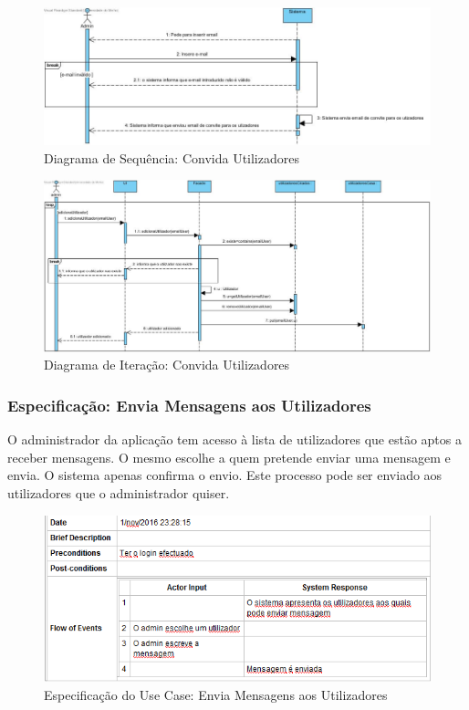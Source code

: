 \begin{figure}[htb!]
	\centering
	\includegraphics[scale=0.5]{imagens/diagramaSeq/ConvidaUtilizadores}  
	\caption{Diagrama de Sequência: Convida Utilizadores }  
\end{figure}

\begin{figure}[htb!]
	\centering
	\includegraphics[scale=0.46]{imagens/diagramaIt/AdicionarUtilizadorGrupo}  
	\caption{Diagrama de Iteração: Convida Utilizadores }  
\end{figure}



\newpage \clearpage

\subsubsection{Especificação: Envia Mensagens aos Utilizadores }
O administrador da aplicação tem acesso à lista de utilizadores que estão aptos a receber mensagens. O mesmo escolhe a quem pretende enviar uma mensagem e envia. O sistema apenas confirma o envio. Este processo pode ser enviado aos utilizadores que o administrador quiser.

\begin{figure}[htb!]
	\centering
	\includegraphics[scale=0.7]{imagens/Especificacoes/enviasmsutilizadores}  
	\caption{Especificação do Use Case: Envia Mensagens aos Utilizadores}  
\end{figure}



